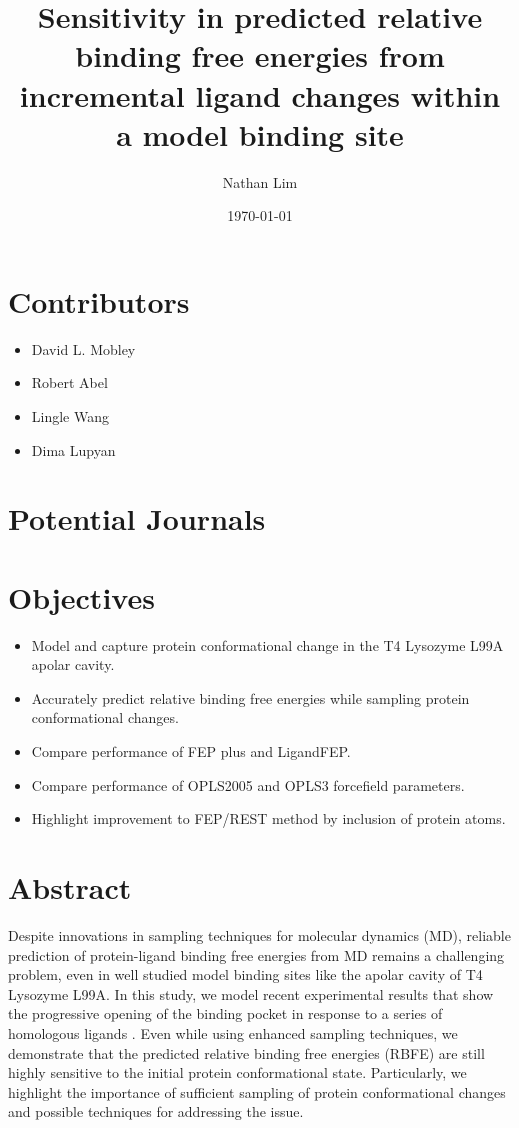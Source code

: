 \documentclass{article}
\begin{document}
\title{Sensitivity in predicted relative binding free energies from incremental ligand changes within a model binding site}
\date{\today}
\author{Nathan Lim}
\maketitle

\section*{Contributors}
\begin{itemize}
   \item David L. Mobley
   \item Robert Abel
   \item Lingle Wang
   \item Dima Lupyan
\end{itemize}

\section*{Potential Journals}

\section*{Objectives}
\begin{itemize}
   \item Model and capture protein conformational change in the T4 Lysozyme L99A apolar cavity.
   \item Accurately predict relative binding free energies while sampling protein conformational changes.
   \item Compare performance of FEP plus \cite{FEPplus} and LigandFEP.
   \item Compare performance of OPLS2005 and OPLS3 forcefield parameters.
   \item Highlight improvement to FEP/REST \cite{REST2} method by inclusion of protein atoms.
\end{itemize}


\section*{Abstract}
Despite innovations in sampling techniques for molecular dynamics (MD), reliable prediction of protein-ligand binding free energies from MD remains a challenging problem, even in well studied model binding sites like the apolar cavity of T4 Lysozyme L99A\cite{Boyce2009}. 
In this study, we model recent experimental results that show the progressive opening of the binding pocket in response to a series of homologous ligands \cite{Merski2015}. 
Even while using enhanced sampling techniques, we demonstrate that the predicted relative binding free energies (RBFE) are still highly sensitive to the initial protein conformational state. 
Particularly, we highlight the importance of sufficient sampling of protein conformational changes and possible techniques for addressing the issue.
\end{document}
